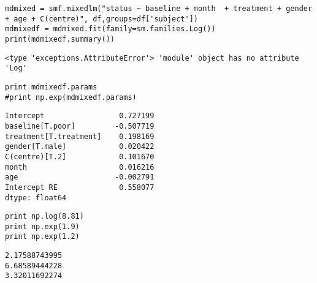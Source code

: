 \documentclass[12pt,fleqn]{article}\usepackage{../common}
\begin{document}
\begin{verbatim}
mdmixed = smf.mixedlm("status ~ baseline + month  + treatment + gender + age + C(centre)", df,groups=df['subject'])
mdmixedf = mdmixed.fit(family=sm.families.Log())
print(mdmixedf.summary())
\end{verbatim}

\begin{verbatim}
<type 'exceptions.AttributeError'> 'module' object has no attribute 'Log'
\end{verbatim}


\begin{verbatim}
print mdmixedf.params
#print np.exp(mdmixedf.params)
\end{verbatim}

\begin{verbatim}
Intercept                 0.727199
baseline[T.poor]         -0.507719
treatment[T.treatment]    0.198169
gender[T.male]            0.020422
C(centre)[T.2]            0.101670
month                     0.016216
age                      -0.002791
Intercept RE              0.558077
dtype: float64
\end{verbatim}

\begin{verbatim}
print np.log(8.81)
print np.exp(1.9)
print np.exp(1.2)
\end{verbatim}

\begin{verbatim}
2.17588743995
6.68589444228
3.32011692274
\end{verbatim}
\end{document}

